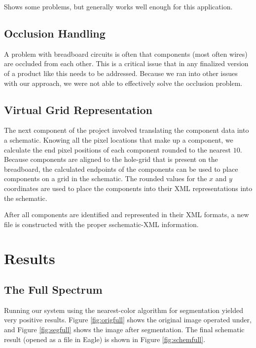\documentclass[10pt,twocolumn,letterpaper]{article}
\begin{document}
Shows some problems, but generally works well enough for this application.

\subsection{Occlusion Handling}

A problem with breadboard circuits is often that components (most often wires)
are occluded from each other. This is a critical issue that in any finalized
version of a product like this needs to be addressed. Because we ran into other
issues with our approach, we were not able to effectively solve the occlusion
problem.  

\subsection{Virtual Grid Representation}

The next component of the project involved translating the component data into
a schematic. Knowing all the pixel locations that make up a component, we
calculate the end pixel positions of each component rounded to the nearest
$10$. Because components are aligned to the hole-grid that is present on the
breadboard, the calculated endpoints of the components can be used to place
components on a grid in the schematic. The rounded values for the $x$ and $y$
coordinates are used to place the components into their XML representations
into the schematic. 

After all components are identified and represented in their XML formats, a new
file is constructed with the proper sschematic-XML information.    

\section{Results}

\subsection{The Full Spectrum}

Running our system using the nearest-color algorithm for segmentation yielded
very positive results. Figure \ref{fig:origfull} shows the original image
operated under, and Figure \ref{fig:segfull} shows the image after
segmentation. The final schematic result (opened as a file in Eagle) is shown
in Figure \ref{fig:schemfull}. 
\end{document}
